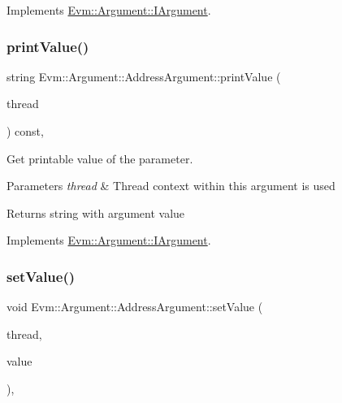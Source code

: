 Implements \mbox{\hyperlink{struct_evm_1_1_argument_1_1_i_argument_a35bdae816e89f6f9fc393b6e03c5e521}{Evm\+::\+Argument\+::\+I\+Argument}}.

\mbox{\label{struct_evm_1_1_argument_1_1_address_argument_afaefa598d24c588a0047df1b88033bbd}} 
\subsubsection{\texorpdfstring{print\+Value()}{printValue()}}
{\footnotesize\ttfamily string Evm\+::\+Argument\+::\+Address\+Argument\+::print\+Value (\begin{DoxyParamCaption}\item[{\mbox{\hyperlink{struct_evm_1_1_thread_context}{Thread\+Context}} \&}]{thread }\end{DoxyParamCaption}) const\hspace{0.3cm}{\ttfamily [override]}, {\ttfamily [virtual]}}



Get printable value of the parameter. 


\begin{DoxyParams}{Parameters}
{\em thread} & Thread context within this argument is used \\
\hline
\end{DoxyParams}
\begin{DoxyReturn}{Returns}
string with argument value 
\end{DoxyReturn}


Implements \mbox{\hyperlink{struct_evm_1_1_argument_1_1_i_argument_afcab2d2a1515518a111881a635c83da3}{Evm\+::\+Argument\+::\+I\+Argument}}.

\mbox{\label{struct_evm_1_1_argument_1_1_address_argument_a2fa90885150424134b181ff01704e798}} 
\subsubsection{\texorpdfstring{set\+Value()}{setValue()}}
{\footnotesize\ttfamily void Evm\+::\+Argument\+::\+Address\+Argument\+::set\+Value (\begin{DoxyParamCaption}\item[{\mbox{\hyperlink{struct_evm_1_1_thread_context}{Thread\+Context}} \&}]{thread,  }\item[{uint64\+\_\+t}]{value }\end{DoxyParamCaption})\hspace{0.3cm}{\ttfamily [override]}, {\ttfamily [virtual]}}



